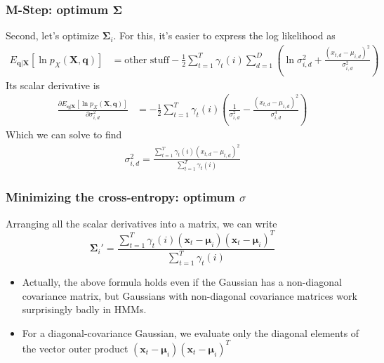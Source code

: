 \documentclass{beamer}
\begin{document}
\begin{frame}
  \frametitle{M-Step: optimum $\mathbf{\Sigma}$}

  Second, let's optimize $\mathbf{\Sigma}_{i}$.
  For this, it's easier to express the log likelihood as
  \begin{align*}
    E_{\mathbf{q}|\mathbf{X}}\left[\ln p_X(\mathbf{X},\mathbf{q})\right] &=\mbox{other stuff}
    -\frac{1}{2}\sum_{t=1}^T\gamma_t(i)
    \sum_{d=1}^D\left(\ln\sigma_{i,d}^2+\frac{(x_{t,d}-\mu_{i,d})^2}{\sigma_{i,d}^2}\right)
  \end{align*}
  Its scalar derivative is
  \begin{align*}
    \frac{\partial E_{\mathbf{q}|\mathbf{X}}\left[\ln p_X(\mathbf{X},\mathbf{q})\right]}{\partial\sigma_{i,d}^2} &=
    -\frac{1}{2}\sum_{t=1}^T\gamma_t(i)\left(\frac{1}{\sigma_{i,d}^2}-\frac{(x_{t,d}-\mu_{i,d})^2}{\sigma_{i,d}^4}\right)
  \end{align*}
  Which we can solve to find
  \begin{align*}
    \sigma_{i,d}^2 = \frac{\sum_{t=1}^T\gamma_t(i)(x_{t,d}-\mu_{t,d})^2}{\sum_{t=1}^T\gamma_t(i)}
  \end{align*}
\end{frame}
  
  
\begin{frame}
  \frametitle{Minimizing the cross-entropy: optimum $\sigma$}

  Arranging all the scalar derivatives into a matrix, we can write
  \begin{displaymath}
    \mathbf{\Sigma}_{i}' = \frac{\sum_{t=1}^T\gamma_t(i)(\mathbf{x}_{t}-\bm{\mu}_{i})(\mathbf{x}_t-\bm{\mu}_i)^T}{\sum_{t=1}^T\gamma_t(i)}
  \end{displaymath}
  \begin{itemize}
    \item 
      Actually, the above formula holds even if the Gaussian has a
      non-diagonal covariance matrix, but Gaussians with non-diagonal
      covariance matrices work surprisingly badly in HMMs.
    \item
      For a diagonal-covariance Gaussian, we evaluate only the
      diagonal elements of the vector outer product
      $(\mathbf{x}_{t}-\bm{\mu}_{i})(\mathbf{x}_t-\bm{\mu}_i)^T$
  \end{itemize}
\end{frame}
\end{document}
